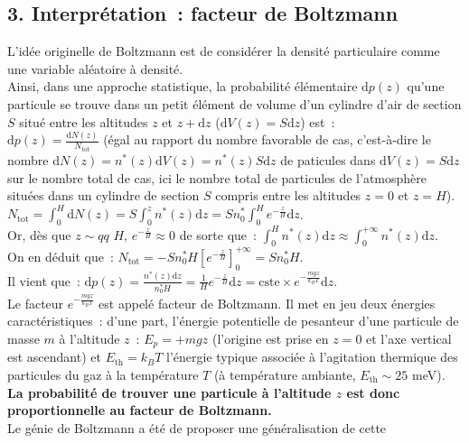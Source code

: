 \documentclass{article}
\begin{document}
\subsection*{3. Interprétation : facteur de Boltzmann}
L'idée originelle de Boltzmann est de considérer la densité
particulaire comme une variable aléatoire à densité. \\
Ainsi, dans une approche statistique, la probabilité élémentaire
$\mathrm{d}p(z)$ qu'une particule se trouve dans un petit élément de volume
d'un cylindre d'air de section $S$ situé entre les
altitudes $z$ et $z+\mathrm{d}z$ ($\mathrm{d}V(z) = S\mathrm{d}z$) est : \\
$\mathrm{d}p(z) = \frac{\mathrm{d}N(z)}{N_{\mathrm{tot}}}$ (égal au rapport du nombre favorable
de cas, c'est-à-dire le nombre $\mathrm{d}N(z) = n^{*}(z)\mathrm{d}V(z) = n^{*}(z)S\mathrm{d}z$
de paticules dans $\mathrm{d}V(z)=S\mathrm{d}z$ sur le nombre
total de cas, ici le nombre total de particules de l'atmosphère situées dans un cylindre de section $S$ compris entre les altitudes $z=0$ et $z=H$). \\
$N_{\mathrm{tot}} = \int_{0}^{H}\mathrm{d}N(z) = S\int_{0}^{z}n^{*}(z)\mathrm{d}z =
Sn_{0}^{*}\int_{0}^{H}e^{-\frac{z}{H}}\mathrm{d}z$. \\
Or, dès que $z \sim qq$ $H$, $e^{-\frac{z}{H}} \approx 0$ de sorte
que : $\int_{0}^{H}n^{*}(z)\mathrm{d}z \approx \int_{0}^{+\infty}n^{*}(z)\mathrm{d}z$.
\\
On en déduit que : $N_{\mathrm{tot}} =
-Sn_{0}^{*}H\left[e^{-\frac{z}{H}}\right]_{0}^{+\infty} = Sn_{0}^{*}H$.
\\
Il vient que : $\mathrm{d}p(z) = \frac{n^{*}(z)\mathrm{d}z}{n_{0}^{*}H} =
\frac{1}{H}e^{-\frac{z}{H}}\mathrm{d}z = \mathrm{cste} \times
e^{-\frac{mgz}{k_{B}T}}\mathrm{d}z$.
\\
Le facteur $e^{-\frac{mgz}{k_{B}T}}$ est appelé facteur de
Boltzmann. Il met en jeu deux énergies caractéristiques : d'une
part, l'énergie potentielle de pesanteur d'une particule de masse
$m$ à l'altitude $z$ : $E_{p} =+mgz$ (l'origine est prise en $z=0$
et l'axe vertical est ascendant) et $E_{\mathrm{th}} = k_{B}T$ l'énergie
typique associée à l'agitation thermique des particules du gaz à la
température $T$ (à
température ambiante, $E_{\mathrm{th}} \sim 25$ meV). \\
\textbf{La probabilité de trouver une particule à l'altitude $z$ est
donc proportionnelle au facteur de Boltzmann.}
\\
Le génie de Boltzmann a été de proposer une généralisation de cette
\end{document}
